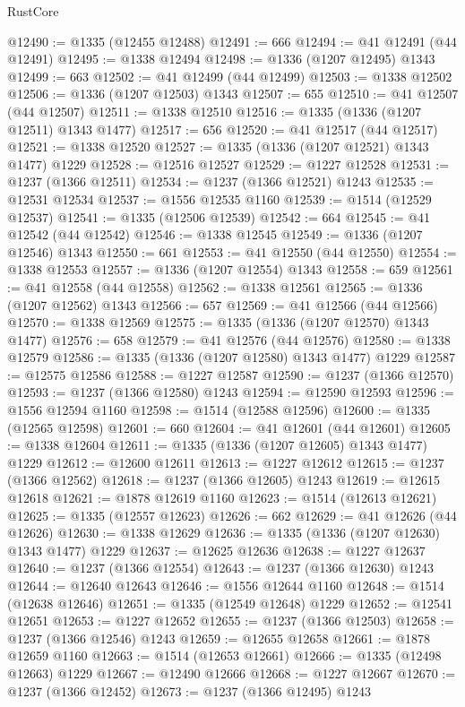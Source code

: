 \begin{lexlean}{RustCore}
\begin{coremodule}
@12490 := @1335 (@12455 @12488)
@12491 := 666
@12494 := @41 @12491 (@44 @12491)
@12495 := @1338 @12494
@12498 := @1336 (@1207 @12495) @1343
@12499 := 663
@12502 := @41 @12499 (@44 @12499)
@12503 := @1338 @12502
@12506 := @1336 (@1207 @12503) @1343
@12507 := 655
@12510 := @41 @12507 (@44 @12507)
@12511 := @1338 @12510
@12516 := @1335 (@1336 (@1207 @12511) @1343 @1477)
@12517 := 656
@12520 := @41 @12517 (@44 @12517)
@12521 := @1338 @12520
@12527 := @1335 (@1336 (@1207 @12521) @1343 @1477) @1229
@12528 := @12516 @12527
@12529 := @1227 @12528
@12531 := @1237 (@1366 @12511)
@12534 := @1237 (@1366 @12521) @1243
@12535 := @12531 @12534
@12537 := @1556 @12535 @1160
@12539 := @1514 (@12529 @12537)
@12541 := @1335 (@12506 @12539)
@12542 := 664
@12545 := @41 @12542 (@44 @12542)
@12546 := @1338 @12545
@12549 := @1336 (@1207 @12546) @1343
@12550 := 661
@12553 := @41 @12550 (@44 @12550)
@12554 := @1338 @12553
@12557 := @1336 (@1207 @12554) @1343
@12558 := 659
@12561 := @41 @12558 (@44 @12558)
@12562 := @1338 @12561
@12565 := @1336 (@1207 @12562) @1343
@12566 := 657
@12569 := @41 @12566 (@44 @12566)
@12570 := @1338 @12569
@12575 := @1335 (@1336 (@1207 @12570) @1343 @1477)
@12576 := 658
@12579 := @41 @12576 (@44 @12576)
@12580 := @1338 @12579
@12586 := @1335 (@1336 (@1207 @12580) @1343 @1477) @1229
@12587 := @12575 @12586
@12588 := @1227 @12587
@12590 := @1237 (@1366 @12570)
@12593 := @1237 (@1366 @12580) @1243
@12594 := @12590 @12593
@12596 := @1556 @12594 @1160
@12598 := @1514 (@12588 @12596)
@12600 := @1335 (@12565 @12598)
@12601 := 660
@12604 := @41 @12601 (@44 @12601)
@12605 := @1338 @12604
@12611 := @1335 (@1336 (@1207 @12605) @1343 @1477) @1229
@12612 := @12600 @12611
@12613 := @1227 @12612
@12615 := @1237 (@1366 @12562)
@12618 := @1237 (@1366 @12605) @1243
@12619 := @12615 @12618
@12621 := @1878 @12619 @1160
@12623 := @1514 (@12613 @12621)
@12625 := @1335 (@12557 @12623)
@12626 := 662
@12629 := @41 @12626 (@44 @12626)
@12630 := @1338 @12629
@12636 := @1335 (@1336 (@1207 @12630) @1343 @1477) @1229
@12637 := @12625 @12636
@12638 := @1227 @12637
@12640 := @1237 (@1366 @12554)
@12643 := @1237 (@1366 @12630) @1243
@12644 := @12640 @12643
@12646 := @1556 @12644 @1160
@12648 := @1514 (@12638 @12646)
@12651 := @1335 (@12549 @12648) @1229
@12652 := @12541 @12651
@12653 := @1227 @12652
@12655 := @1237 (@1366 @12503)
@12658 := @1237 (@1366 @12546) @1243
@12659 := @12655 @12658
@12661 := @1878 @12659 @1160
@12663 := @1514 (@12653 @12661)
@12666 := @1335 (@12498 @12663) @1229
@12667 := @12490 @12666
@12668 := @1227 @12667
@12670 := @1237 (@1366 @12452)
@12673 := @1237 (@1366 @12495) @1243

\end{coremodule}
\end{lexlean}
